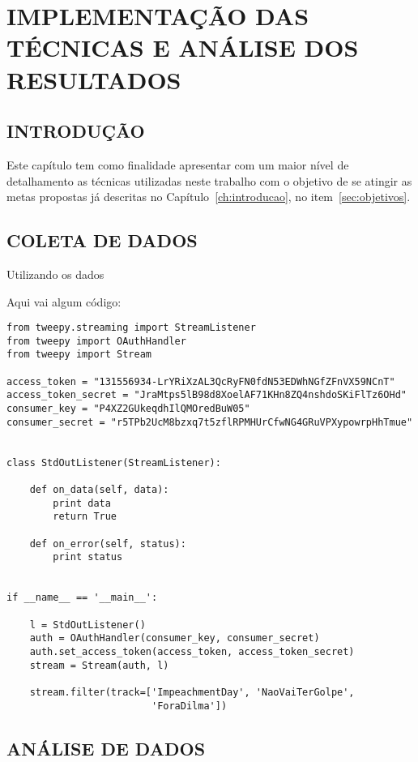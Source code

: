 \chapter{IMPLEMENTAÇÃO DAS TÉCNICAS E ANÁLISE DOS RESULTADOS}\label{ch:implementacao}

\section{INTRODUÇÃO}
Este capítulo tem como finalidade apresentar com um maior nível de detalhamento as técnicas utilizadas neste trabalho com o objetivo de se atingir as metas propostas já descritas no Capítulo~\ref{ch:introducao}, no item~\ref{sec:objetivos}.

\section{COLETA DE DADOS}
Utilizando os dados

Aqui vai algum código:
\begin{lstlisting}
from tweepy.streaming import StreamListener
from tweepy import OAuthHandler
from tweepy import Stream

access_token = "131556934-LrYRiXzAL3QcRyFN0fdN53EDWhNGfZFnVX59NCnT"
access_token_secret = "JraMtps5lB98d8XoelAF71KHn8ZQ4nshdoSKiFlTz6OHd"
consumer_key = "P4XZ2GUkeqdhIlQMOredBuW05"
consumer_secret = "r5TPb2UcM8bzxq7t5zflRPMHUrCfwNG4GRuVPXypowrpHhTmue"


class StdOutListener(StreamListener):

    def on_data(self, data):
        print data
        return True

    def on_error(self, status):
        print status


if __name__ == '__main__':

    l = StdOutListener()
    auth = OAuthHandler(consumer_key, consumer_secret)
    auth.set_access_token(access_token, access_token_secret)
    stream = Stream(auth, l)

    stream.filter(track=['ImpeachmentDay', 'NaoVaiTerGolpe',
    					 'ForaDilma'])

\end{lstlisting}



\section{ANÁLISE DE DADOS}